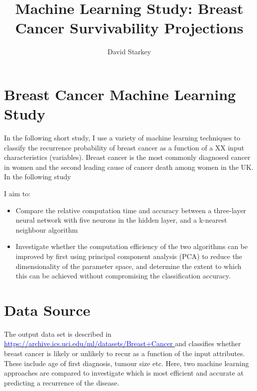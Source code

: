 \documentclass[10pt]{article}
\begin{document}
\title{Machine Learning Study: Breast Cancer Survivability Projections}

\author{David Starkey}

\maketitle





\section{Breast Cancer Machine Learning Study}
In the following short study, I use a variety of machine learning techniques to classify the recurrence probability of breast cancer as a function of a XX input characteristics (variables). Breast cancer is the most commonly diagnosed cancer in women and the second leading cause of cancer death among women in the UK. In the following study

 I aim to:

\begin{itemize}
\item Compare the relative computation time and accuracy between a three-layer neural network with five neurons in the hidden layer, and a k-nearest neighbour algorithm

\item Investigate whether the computation efficiency of the two algorithms can be improved by first using principal component analysis (PCA) to reduce the dimensionality of the parameter space, and determine the extent to which this can be achieved without compromising the classification accuracy. 

\end{itemize}



\section{Data Source}
The output data set is described in \href{ https://archive.ics.uci.edu/ml/datasets/Breast+Cancer
}{\textcolor{blue}{https://archive.ics.uci.edu/ml/datasets/Breast+Cancer
}} and classifies whether breast cancer is likely or unlikely to recur as a function of the input attributes. These include age of first diagnosis, tumour size etc. Here, two machine learning approaches are compared to investigate which is most efficient and accurate at predicting a recurrence of the disease.
\end{document}
